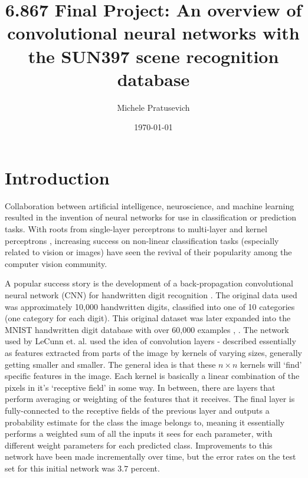 \documentclass[10pt]{article}
\begin{document}
\title{6.867 Final Project: An overview of convolutional neural networks with the SUN397 scene recognition database}
\author{Michele Pratusevich}
\date{\today}
\maketitle

\section{Introduction}

Collaboration between artificial intelligence, neuroscience, and machine learning resulted in the invention of neural networks for use in classification or prediction tasks. With roots from single-layer perceptrons \cite{rosenblatt_perceptron:_1958} to multi-layer and kernel perceptrons \cite{aizerman_theoretical_1964}, increasing success on non-linear classification tasks (especially related to vision or images) have seen the revival of their popularity among the computer vision community. 

A popular success story is the development of a back-propagation convolutional neural network (CNN) for handwritten digit recognition \cite{lecun_handwritten_1990}. The original data used was approximately 10,000 handwritten digits, classified into one of 10 categories (one category for each digit). This original dataset was later expanded into the MNIST handwritten digit database with over 60,000 examples \cite{lecun_gradient-based_1998}, \cite{li_deng_mnist_2012}. The network used by LeCunn et. al. used the idea of convolution layers - described essentially as features extracted from parts of the image by kernels of varying sizes, generally getting smaller and smaller. The general idea is that these $n \times n$ kernels will `find' specific features in the image. Each kernel is basically a linear combination of the pixels in it's `receptive field' in some way. In between, there are layers that perform averaging or weighting of the features that it receives. The final layer is fully-connected to the receptive fields of the previous layer and outputs a probability estimate for the class the image belongs to, meaning it essentially performs a weighted sum of all the inputs it sees for each parameter, with different weight parameters for each predicted class. Improvements to this network have been made incrementally over time, but the error rates on the test set for this initial network was $3.7$ percent. 
\end{document}

